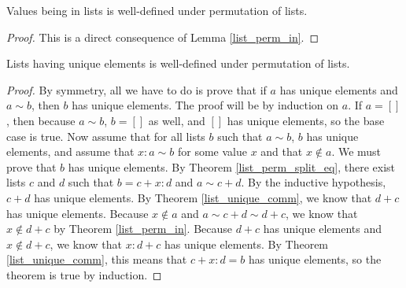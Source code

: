 \documentclass[../math.tex]{subfiles}
\begin{document}
\begin{lemma}
    Values being in lists is well-defined under permutation of lists.
\end{lemma}
\begin{proof}
    This is a direct consequence of Lemma \ref{list_perm_in}.
\end{proof}

\begin{lemma}
    Lists having unique elements is well-defined under permutation of lists.
\end{lemma}
\begin{proof}
    By symmetry, all we have to do is prove that if $a$ has unique elements and
    $a \sim b$, then $b$ has unique elements.  The proof will be by induction on
    $a$.  If $a = []$, then because $a \sim b$, $b = []$ as well, and $[]$ has
    unique elements, so the base case is true.  Now assume that for all lists
    $b$ such that $a \sim b$, $b$ has unique elements, and assume that $x : a
    \sim b$ for some value $x$ and that $x \notin a$.  We must prove that $b$
    has unique elements.  By Theorem \ref{list_perm_split_eq}, there exist lists
    $c$ and $d$ such that $b = c + x : d$ and $a \sim c + d$.  By the inductive
    hypothesis, $c + d$ has unique elements.  By Theorem \ref{list_unique_comm},
    we know that $d + c$ has unique elements.  Because $x \notin a$ and $a \sim
    c + d \sim d + c$, we know that $x \notin d + c$ by Theorem
    \ref{list_perm_in}.  Because $d + c$ has unique elements and $x \notin d +
    c$, we know that $x : d + c$ has unique elements.  By Theorem
    \ref{list_unique_comm}, this means that $c + x : d = b$ has unique elements,
    so the theorem is true by induction.
\end{proof}
\end{document}
